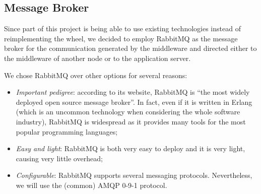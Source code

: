 \subsection{Message Broker}
Since part of this project is being able to use existing technologies instead of
reimplementing the wheel, we decided to employ RabbitMQ as the message broker
for the communication generated by the middleware and directed either to
the middleware of another node or to the application server.

We chose RabbitMQ over other options for several reasons:
\begin{itemize}
  \item \textit{Important pedigree}: according to its website, RabbitMQ is ``the
        most widely deployed open source message broker''. In fact, even if it
        is written in Erlang (which is an uncommon technology when considering
        the whole software industry), RabbitMQ is widespread as it provides many
        tools for the most popular programming languages;
  \item \textit{Easy and light}: RabbitMQ is both very easy to deploy and it is
        very light, causing very little overhead;
  \item \textit{Configurable}: RabbitMQ supports several messaging protocols.
        Nevertheless, we will use the (common) AMQP 0-9-1 protocol.
\end{itemize}
